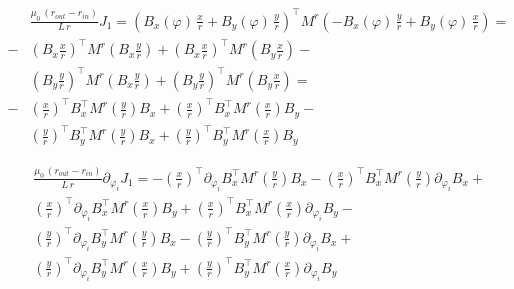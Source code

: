 \begin{align*}
&\frac{\mu_0\,\left(r_{out} - r_{in}\right)}{L\,r} J_1 =  \left(  B_x \left(\varphi\right) \,\frac{x}{r} + B_y \left(\varphi\right) \,\frac{y}{r} \right)^\top M^r \left( - B_x \left(\varphi\right) \,\frac{y}{r} + B_y \left(\varphi\right) \,\frac{x}{r} \right) = \\
 - &\left(B_x \frac{x}{r}\right)^\top M^r \left(B_x \frac{y}{r}\right) + \left(B_x \frac{x}{r}\right)^\top M^r \left(B_y \frac{x}{r}\right) - \\
&\left(B_y \frac{y}{r}\right)^\top M^r \left(B_x \frac{y}{r}\right) + \left(B_y \frac{y}{r}\right)^\top M^r \left(B_y \frac{x}{r}\right) = \\
 - &\left(\frac{x}{r}\right)^\top B_x^\top  M^r \left(\frac{y}{r}\right) B_x  + \left(\frac{x}{r}\right)^\top B_x^\top  M^r \left( \frac{x}{r}\right) B_y  - \\
&\left(\frac{y}{r}\right)^\top B_y^\top  M^r \left(\frac{y}{r}\right) B_x  + \left(\frac{y}{r}\right)^\top B_y^\top M^r \left( \frac{x}{r}\right) B_y 
\end{align*}

\begin{align*}
&\frac{\mu_0\,\left(r_{out} - r_{in}\right)}{L\,r} \partial_{\varphi_i} J_1 = - \left(\frac{x}{r}\right)^\top \partial_{\varphi_i} B_x^\top  M^r \left(\frac{y}{r}\right) B_x  - \left(\frac{x}{r}\right)^\top  B_x^\top  M^r \left(\frac{y}{r}\right) \partial_{\varphi_i} B_x  + \\
&\left(\frac{x}{r}\right)^\top  \partial_{\varphi_i} B_x^\top  M^r \left( \frac{x}{r}\right) B_y   + \left(\frac{x}{r}\right)^\top B_x^\top  M^r \left( \frac{x}{r}\right)  \partial_{\varphi_i} B_y  - \\
&\left(\frac{y}{r}\right)^\top \partial_{\varphi_i} B_y^\top  M^r \left(\frac{y}{r}\right) B_x  - \left(\frac{y}{r}\right)^\top B_y^\top  M^r \left(\frac{y}{r}\right) \partial_{\varphi_i} B_x  + \\
&\left(\frac{y}{r}\right)^\top \partial_{\varphi_i} B_y^\top M^r \left( \frac{x}{r}\right) B_y  + \left(\frac{y}{r}\right)^\top B_y^\top M^r \left( \frac{x}{r}\right) \partial_{\varphi_i} B_y 
\end{align*}







